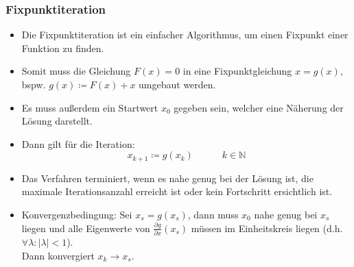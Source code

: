 \documentclass[a4paper, 11pt, accentcolor = tud3b]{tudreport}
\providecommand{\abs}[1]{\ensuremath{{\lvert #1 \rvert}}}
\begin{document}
                \subsubsection{Fixpunktiteration} %
	                \begin{itemize}
	                	\item Die Fixpunktiteration ist ein einfacher Algorithmus, um einen Fixpunkt einer Funktion zu finden.
	                	\item Somit muss die Gleichung \( F(x) = 0 \) in eine Fixpunktgleichung \( x = g(x) \), bspw. \( g(x) \coloneqq F(x) + x \) umgebaut werden.
	                	\item Es muss außerdem ein Startwert \( x _ 0 \) gegeben sein, welcher eine Näherung der Lösung darstellt.
	                	\item Dann gilt für die Iteration:
		                	\begin{equation*}
			                	 x_ { k + 1 } \coloneqq g(x _ k) \quad\quad\quad k \in \mathbb{N}
		                	\end{equation*}
	                	\item Das Verfahren terminiert, wenn es nahe genug bei der Lösung ist, die maximale Iterationsanzahl erreicht ist oder kein Fortschritt ersichtlich ist.
	                	\item Konvergenzbedingung: Sei \( x _ s = g(x _ s) \), dann muss \( x _ 0 \) nahe genug bei \( x _ s \) liegen und alle Eigenwerte von \( \frac{\partial g}{\partial x} (x _ s) \) müssen im Einheitskreis liegen (d.h. \( \forall \lambda : \abs{\lambda} < 1 \)). \\ Dann konvergiert \( x _ k \rightarrow x _ s \).
	                \end{itemize}
\end{document}
